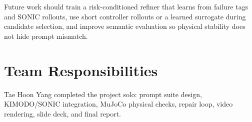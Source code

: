 \documentclass[10pt]{article}
\begin{document}
Future work should train a risk-conditioned refiner that learns from failure
tags and SONIC rollouts, use short controller rollouts or a learned surrogate
during candidate selection, and improve semantic evaluation so physical
stability does not hide prompt mismatch.

\section{Team Responsibilities}

Tae Hoon Yang completed the project solo: prompt suite design, KIMODO/SONIC
integration, MuJoCo physical checks, repair loop, video rendering, slide deck,
and final report.



\end{document}
